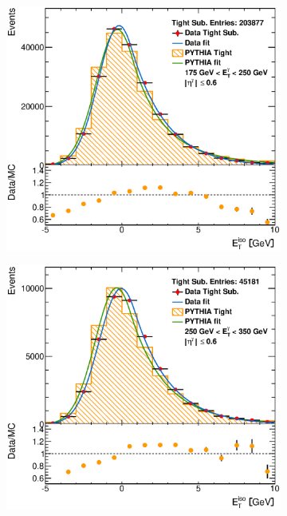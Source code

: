 \documentclass[12pt, twoside]{article}
\numberwithin{equation}{section}
\numberwithin{figure}{section}
\newenvironment{changemargin}[2]{%
\begin{list}{}{%
\setlength{\topsep}{0pt}%
\setlength{\leftmargin}{#1}%
\setlength{\rightmargin}{#2}%
\setlength{\listparindent}{\parindent}%
\setlength{\itemindent}{\parindent}%
\setlength{\parsep}{\parskip}%
}%
\item[]}{\end{list}}
\begin{document}
\begin{figure}[H]
\begin{changemargin}{-1.0cm}{-0.75cm}
\begin{changemargin}{-0.75cm}{-1.0cm}
\begin{subfigure}[b]{0.27\textwidth}
            \includegraphics[width=\textwidth]{./images/EtISOCorrection/T_MC_FITS-12(10GeV)(Before).eps}
        \end{subfigure}
        \begin{subfigure}[b]{0.27\textwidth}
            \includegraphics[width=\textwidth]{./images/EtISOCorrection/T_MC_FITS-13(10GeV)(Before).eps}
        \end{subfigure}
        \begin{subfigure}[b]{0.27\textwidth}

\end{subfigure}
\end{changemargin}
\end{changemargin}
\end{figure}
\end{document}
